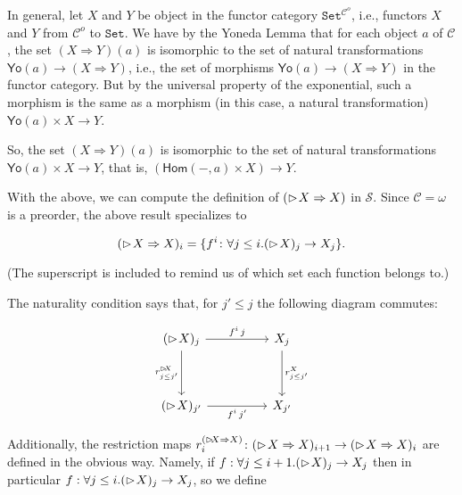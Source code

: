 \documentclass{article}
\newcommand{\later}{\vartriangleright\hspace{-2px}}
\newcommand{\calS}{\mathcal{S}}
\newcommand{\To}{\Rightarrow}
\newcommand{\calC}{\mathcal{C}}
\newcommand{\Set}{\texttt{Set}}
\newcommand{\Yo}{\mathsf{Yo}}
\newcommand{\Hom}{\mathsf{Hom}}
\begin{document}
In general, let $X$ and $Y$ be object in the functor category $\Set^{\calC^o}$, i.e., functors
$X$ and $Y$ from $\calC^o$ to $\Set$.
We have by the Yoneda Lemma that for each object $a$ of $\calC$, the set
$(X \To Y)(a)$ is isomorphic to the set of natural transformations $\Yo(a) \to (X \To Y)$,
i.e., the set of morphisms $\Yo(a) \to (X \To Y)$ in the functor category.
But by the universal property of the exponential, such a morphism is the same
as a morphism (in this case, a natural transformation) $\Yo(a) \times X \to Y$.

So, the set $(X \To Y)(a)$ is isomorphic to the set of natural transformations
$\Yo(a) \times X \to Y$, that is, $(\Hom(-,a) \times X) \to Y$.






With the above, we can compute the definition of $(\later X \To X)$ in $\calS$.
Since $\calC = \omega$ is a preorder, the above result specializes to

\[
    (\later X \To X)_i = \{ f^i \colon \forall j \le i. (\later X)_j \to X_j \}.
\]

(The superscript is included to remind us of which set each function belongs to.)

The naturality condition says that, for $j' \le j$ the following diagram commutes:


\[\begin{tikzcd}
	{(\later X)_j} && {X_j} \\
	\\
	{(\later X)_{j'}} && {X_{j'}}
	\arrow["{r_{j \le j'}^{\later X}}"', from=1-1, to=3-1]
	\arrow["{r_{j \le j'}^{X}}", from=1-3, to=3-3]
	\arrow["{f^i \, j'}"', from=3-1, to=3-3]
	\arrow["{f^i\, j}", from=1-1, to=1-3]
\end{tikzcd}\]



Additionally, the restriction maps 
$r_i^{(\later X \To X)} \colon (\later X \To X)_{i+1} \to (\later X \To X)_{i}$
are defined in the obvious way.
Namely, if $f : \forall j \le i+1 . (\later X)_j \to X_j$ then in particular
$f : \forall j \le i . (\later X)_j \to X_j$, so we define
\end{document}
